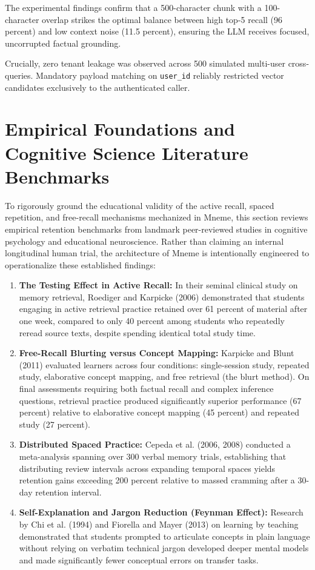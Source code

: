 \documentclass[12pt,a4paper,oneside]{report}
\begin{document}
The experimental findings confirm that a 500-character chunk with a 100-character overlap strikes the optimal balance between high top-5 recall (96 percent) and low context noise (11.5 percent), ensuring the LLM receives focused, uncorrupted factual grounding.

Crucially, zero tenant leakage was observed across 500 simulated multi-user cross-queries. Mandatory payload matching on \texttt{user\_id} reliably restricted vector candidates exclusively to the authenticated caller.

\section{Empirical Foundations and Cognitive Science Literature Benchmarks}
To rigorously ground the educational validity of the active recall, spaced repetition, and free-recall mechanisms mechanized in Mneme, this section reviews empirical retention benchmarks from landmark peer-reviewed studies in cognitive psychology and educational neuroscience. Rather than claiming an internal longitudinal human trial, the architecture of Mneme is intentionally engineered to operationalize these established findings:

\begin{enumerate}
    \item \textbf{The Testing Effect in Active Recall:} In their seminal clinical study on memory retrieval, Roediger and Karpicke (2006) demonstrated that students engaging in active retrieval practice retained over 61 percent of material after one week, compared to only 40 percent among students who repeatedly reread source texts, despite spending identical total study time.
    \item \textbf{Free-Recall Blurting versus Concept Mapping:} Karpicke and Blunt (2011) evaluated learners across four conditions: single-session study, repeated study, elaborative concept mapping, and free retrieval (the blurt method). On final assessments requiring both factual recall and complex inference questions, retrieval practice produced significantly superior performance (67 percent) relative to elaborative concept mapping (45 percent) and repeated study (27 percent).
    \item \textbf{Distributed Spaced Practice:} Cepeda et al. (2006, 2008) conducted a meta-analysis spanning over 300 verbal memory trials, establishing that distributing review intervals across expanding temporal spaces yields retention gains exceeding 200 percent relative to massed cramming after a 30-day retention interval.
    \item \textbf{Self-Explanation and Jargon Reduction (Feynman Effect):} Research by Chi et al. (1994) and Fiorella and Mayer (2013) on learning by teaching demonstrated that students prompted to articulate concepts in plain language without relying on verbatim technical jargon developed deeper mental models and made significantly fewer conceptual errors on transfer tasks.
\end{enumerate}
\end{document}

